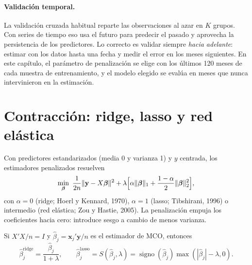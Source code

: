 \paragraph{Validación temporal.} La validación cruzada habitual reparte las observaciones al azar en $K$ grupos. Con series de
tiempo eso usa el futuro para predecir el pasado y aprovecha la persistencia de los predictores. Lo correcto es validar
siempre \emph{hacia adelante}: estimar con los datos hasta una fecha y medir el error en los meses siguientes. En este
capítulo, el parámetro de penalización se elige con los últimos 120 meses de cada muestra de entrenamiento, y el modelo
elegido se evalúa en meses que nunca intervinieron en la estimación.

\section{Contracción: ridge, lasso y red elástica}

Con predictores estandarizados (media 0 y varianza 1) y $y$ centrada, los estimadores penalizados resuelven
\[
  \min_{\boldsymbol\beta}\ \frac{1}{2n}\lVert\mathbf y-X\boldsymbol\beta\rVert^2+\lambda\Bigl[\alpha\lVert\boldsymbol\beta\rVert_1+\frac{1-\alpha}{2}\lVert\boldsymbol\beta\rVert_2^2\Bigr],
\]
con $\alpha=0$ (ridge; Hoerl y Kennard, 1970), $\alpha=1$ (lasso; Tibshirani, 1996) o intermedio (red elástica; Zou y Hastie, 2005).
La penalización empuja los coeficientes hacia cero: introduce sesgo a cambio de menos varianza.

\begin{proposicion}\label{prop:contraccion}
Si $X'X/n=I$ y $\hat\beta_j=\mathbf x_j'\mathbf y/n$ es el estimador de MCO, entonces
\[
  \hat\beta_j^{\text{ridge}}=\frac{\hat\beta_j}{1+\lambda},\qquad
  \hat\beta_j^{\text{lasso}}=S(\hat\beta_j,\lambda)=\operatorname{signo}(\hat\beta_j)\max(|\hat\beta_j|-\lambda,0).
\]
\end{proposicion}

